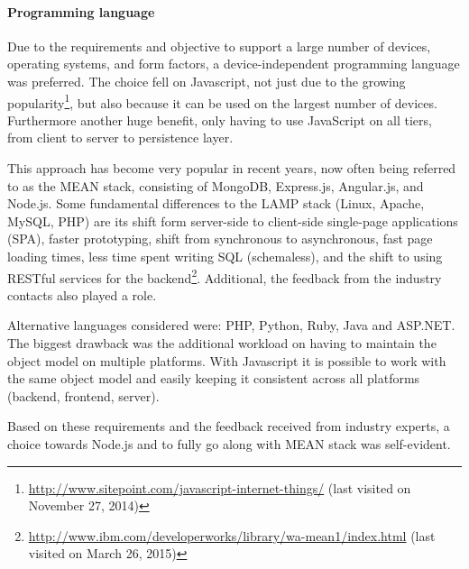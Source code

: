 

	\paragraph{Programming language}

		Due to the requirements and objective to support a large number of devices, operating systems, and form factors, a device-independent programming language was preferred. 
		The choice fell on Javascript, not just due to the growing popularity\footnote{\url{http://www.sitepoint.com/javascript-internet-things/} (last visited on November 27, 2014)}, but also because it can be used on the largest number of devices. Furthermore another huge benefit, only having to use JavaScript on all tiers, from client to server to persistence layer.

		This approach has become very popular in recent years, now often being referred to as the MEAN stack, consisting of MongoDB, Express.js, Angular.js, and Node.js. Some fundamental differences to the LAMP stack (Linux, Apache, MySQL, PHP) are its shift form server-side to client-side single-page applications (SPA), faster prototyping, shift from synchronous to asynchronous, fast page loading times, less time spent writing SQL (schemaless), and the shift to using RESTful services for the backend\footnote{\url{http://www.ibm.com/developerworks/library/wa-mean1/index.html} (last visited on March 26, 2015)}. Additional, the feedback from the industry contacts also played a role. 

		Alternative languages considered were: PHP, Python, Ruby, Java and ASP.NET. The biggest drawback was the additional workload on having to maintain the object model on multiple platforms. With Javascript it is possible to work with the same object model and easily keeping it consistent across all platforms (backend, frontend, server).


				Based on these requirements and the feedback received from industry experts, a choice towards Node.js and to fully go along with MEAN stack was self-evident.



